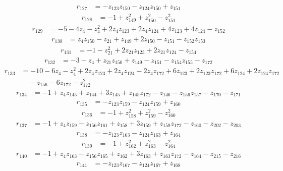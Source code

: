 \begin{align*}
r_{127} &=-z_{123}z_{150}-z_{124}z_{150}+z_{151}
\end{align*}
\begin{align*}
r_{128} &=-1+z_{149}^{2}+z_{150}^{2}-z_{151}^{2}
\end{align*}
\begin{align*}
r_{129} &=-5-4z_{4}-z_{4}^{2}+2z_{4}z_{123}+2z_{4}z_{124}+4z_{123}+4z_{124}-z_{152}
\end{align*}
\begin{align*}
r_{130} &=z_{4}z_{150}-z_{21}+z_{149}+2z_{150}-z_{151}-z_{152}z_{153}
\end{align*}
\begin{align*}
r_{131} &=-1-z_{21}^{2}+2z_{21}z_{123}+2z_{21}z_{124}-z_{154}
\end{align*}
\begin{align*}
r_{132} &=-3-z_{4}+z_{21}z_{150}+z_{149}-z_{151}-z_{154}z_{155}-z_{172}
\end{align*}
\begin{align*}
r_{133} &=-10-6z_{4}-z_{4}^{2}+2z_{4}z_{123}+2z_{4}z_{124}-2z_{4}z_{172}+6z_{123}+2z_{123}z_{172}+6z_{124}+2z_{124}z_{172}\\
&\quad -z_{156}-6z_{172}-z_{172}^{2}
\end{align*}
\begin{align*}
r_{134} &=-1+z_{4}z_{145}+z_{144}+3z_{145}+z_{145}z_{172}-z_{146}-z_{156}z_{157}-z_{170}-z_{171}
\end{align*}
\begin{align*}
r_{135} &=-z_{123}z_{159}-z_{124}z_{159}+z_{160}
\end{align*}
\begin{align*}
r_{136} &=-1+z_{158}^{2}+z_{159}^{2}-z_{160}^{2}
\end{align*}
\begin{align*}
r_{137} &=-1+z_{4}z_{159}-z_{156}z_{161}+z_{158}+3z_{159}+z_{159}z_{172}-z_{160}-z_{202}-z_{203}
\end{align*}
\begin{align*}
r_{138} &=-z_{123}z_{163}-z_{124}z_{163}+z_{164}
\end{align*}
\begin{align*}
r_{139} &=-1+z_{162}^{2}+z_{163}^{2}-z_{164}^{2}
\end{align*}
\begin{align*}
r_{140} &=-1+z_{4}z_{163}-z_{156}z_{165}+z_{162}+3z_{163}+z_{163}z_{172}-z_{164}-z_{215}-z_{216}
\end{align*}
\begin{align*}
r_{141} &=-z_{123}z_{167}-z_{124}z_{167}+z_{168}
\end{align*}
